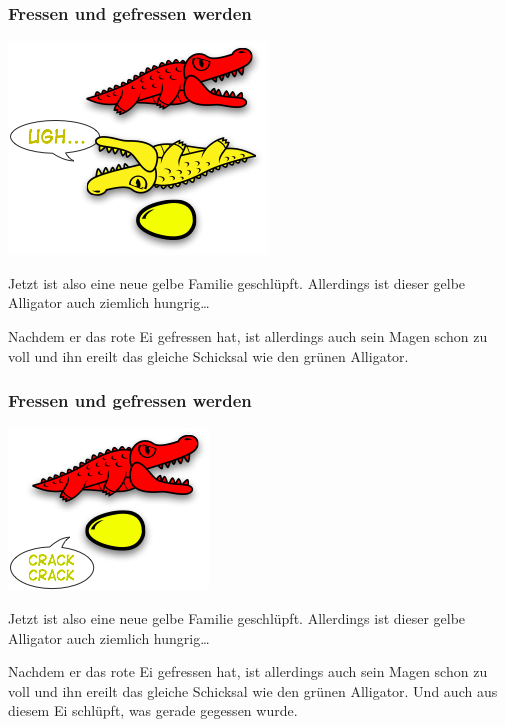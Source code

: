 \documentclass{beamer}
\begin{document}

\begin{frame}
\begin{multicols}{2}
\frametitle{Fressen und gefressen werden}

\begin{center}
\includegraphics[scale=0.45]{eating_8.png} 
\end{center}
\columnbreak

Jetzt ist also eine neue gelbe Familie geschlüpft. Allerdings ist dieser gelbe Alligator auch ziemlich hungrig\dots

Nachdem er das rote Ei gefressen hat, ist allerdings auch sein Magen schon zu voll und ihn ereilt das gleiche Schicksal wie den grünen Alligator.

\end{multicols}
\end{frame}


\begin{frame}
\begin{multicols}{2}
\frametitle{Fressen und gefressen werden}

\begin{center}
\includegraphics[scale=0.45]{eating_9.png} 
\end{center}
\columnbreak

Jetzt ist also eine neue gelbe Familie geschlüpft. Allerdings ist dieser gelbe Alligator auch ziemlich hungrig\dots

Nachdem er das rote Ei gefressen hat, ist allerdings auch sein Magen schon zu voll und ihn ereilt das gleiche Schicksal wie den grünen Alligator. Und auch aus diesem Ei schlüpft, was gerade gegessen wurde.

\end{multicols}
\end{frame}
\end{document}
